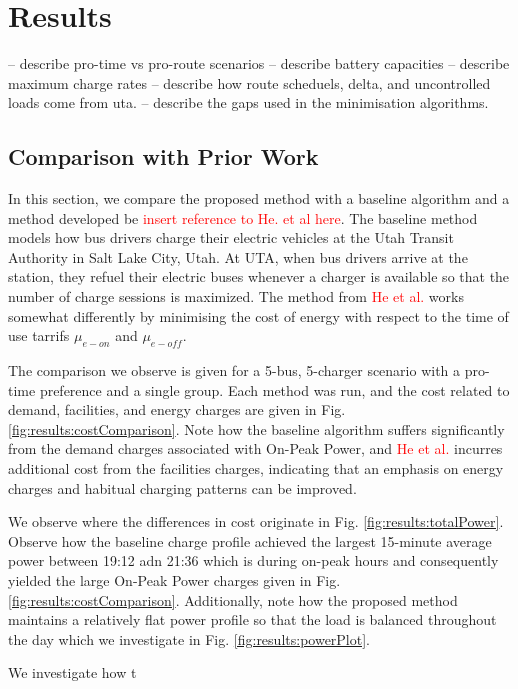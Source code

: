 \section{Results}
-- describe pro-time vs pro-route scenarios
-- describe battery capacities
-- describe maximum charge rates
-- describe how route scheduels, delta, and uncontrolled loads come from uta.
-- describe the gaps used in the minimisation algorithms.
\subsection{Comparison with Prior Work}
In this section, we compare the proposed method with a baseline algorithm and a method developed be \textcolor{red}{insert reference to He. et al here}. The baseline method models how bus drivers charge their electric vehicles at the Utah Transit Authority in Salt Lake City, Utah. At UTA, when bus drivers arrive at the station, they refuel their electric buses whenever a charger is available so that the number of charge sessions is maximized. The method from \textcolor{red}{He et al.} works somewhat differently by minimising the cost of energy with respect to the time of use tarrifs $\mu_{e-on}$ and $\mu_{e-off}$.
\par The comparison we observe is given for a 5-bus, 5-charger scenario with a pro-time preference and a single group. Each method was run, and the cost related to demand, facilities, and energy charges are given in Fig. \ref{fig:results:costComparison}. Note how the baseline algorithm suffers significantly from the demand charges associated with On-Peak Power, and \textcolor{red}{He et al.} incurres additional cost from the facilities charges, indicating that an emphasis on energy charges and habitual charging patterns can be improved.
\par We observe where the differences in cost originate in Fig. \ref{fig:results:totalPower}. Observe how the baseline charge profile achieved the largest 15-minute average power between 19:12 adn 21:36 which is during on-peak hours and consequently yielded the large On-Peak Power charges given in Fig. \ref{fig:results:costComparison}. Additionally, note how the proposed method maintains a relatively flat power profile so that the load is balanced throughout the day which we investigate in Fig. \ref{fig:results:powerPlot}.
\par We investigate how t 
 



